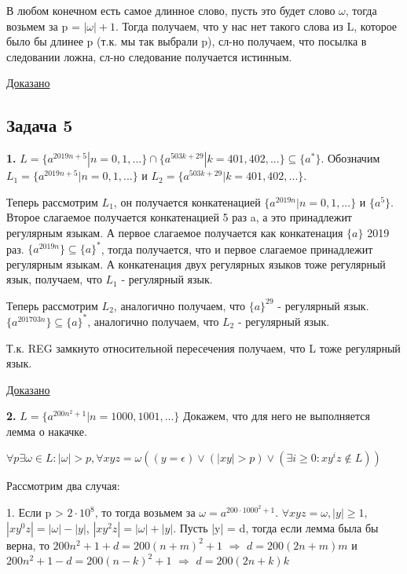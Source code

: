\documentclass[a4paper,14pt]{article} %
\begin{document}
    В любом конечном есть самое длинное слово, пусть это будет слово $\omega$, тогда возьмем за p = $|\omega| + 1$.
    Тогда получаем, что у нас нет такого слова из L, которое было бы длинее p (т.к. мы так выбрали p), сл-но получаем, что посылка в следовании ложна, сл-но следование получается истинным.

    \underline{Доказано}

    \subsection{Задача 5}
    \textbf{1.} $L = \{a^{2019n + 5} | n =0, 1, ...\} \cap \{a^{503k + 29} | k = 401, 402, ... \} \subseteq \{a^*\}$.
    Обозначим $L_1 = \{a^{2019n + 5} | n =0, 1, ...\}$ и $L_2 = \{a^{503k + 29} | k = 401, 402, ... \}$.
    
    Теперь рассмотрим $L_1$, он получается конкатенацией $\{a^{2019n} | n =0, 1, ...\}$ и $\{a^5\}$. Второе слагаемое получается конкатенацией 5 раз a, а это принадлежит регулярным языкам.
    А первое слагаемое получается как конкатенация $\{ a\}$ 2019 раз.
    $\{a^{2019n} \} \subseteq \{a\}^{*} $, тогда получается, что и первое слагаемое принадлежит регулярным языкам.
    А конкатенация двух регулярных языков тоже регулярный язык, получаем, что $L_1$ - регулярный язык.

    Теперь рассмотрим $L_2$, аналогично получаем, что $\{a\}^{29}$ - регулярный язык.
    $\{a^{201703n}\} \subseteq \{a\}^*$, аналогично получаем, что $L_2$ - регулярный язык.
    
    Т.к. REG замкнуто относительной пересечения получаем, что L тоже регулярный язык.

    \underline{Доказано}

    \textbf{2.} $L = \{a^{200n^2 + 1}| n = 1000, 1001, ...\}$
    Докажем, что для него не выполняется лемма о накачке.
    
    $\forall p \exists \omega \in L : |\omega| > p, \forall xyz = \omega ((y = \epsilon) \vee (|xy| > p) \vee (\exists i \geqslant 0 : xy^iz \notin L))$

    Рассмотрим два случая:

    1. Если p > $2 \cdot 10^8$, то тогда возьмем за $\omega = a^{200 \cdot 1000^2 + 1}$. 
    $\forall xyz = \omega, |y| \geqslant 1,$ $|xy^0z| = |\omega| - |y|$, $|xy^2z| = |\omega| + |y|$. 
    Пусть |y| = d, тогда если лемма была бы верна, то 
    $200n^2 +1 +d = 200(n+m)^2+1$ $\Rightarrow$ $d = 200(2n+m)m$
    и $200n^2+1-d = 200(n-k)^2 + 1$ $\Rightarrow$ $d = 200(2n+k)k$
\end{document}
